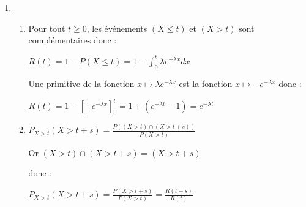 \begin{corrige}
     \par
     \begin{enumerate}
          \par
          \item
          \par
          \begin{enumerate}[label=\alph*.]
               \par
               \item  Pour tout $t\geqslant 0$, les événements $\left(X\leqslant t\right)$ et $\left(X > t\right)$ sont complémentaires donc :
               \par
               \par
               \par
               $R\left(t\right)=1-P\left(X\leqslant t\right)=1-\int_{0}^{t}\lambda  e^{-\lambda  x}dx$
               \par
               \par
               \par
               Une primitive de la fonction $x\mapsto \lambda  e^{-\lambda  x}$ est la fonction  $x\mapsto -e^{-\lambda  x}$ donc :
               \par
               \par
               \par
               $R\left(t\right)=1-\left[- e^{-\lambda  x}\right]_{0}^{t}=1+\left(e^{-\lambda  t}-1\right)=e^{-\lambda  t}$
               \par
               \item  $P_{X > t}\left(X > t+s\right)=\frac{P\left(\left(X > t\right) \cap  \left(X > t+s\right)\right)}{P\left(X > t\right)}$
               \par
               \par
               \par
               Or $\left(X > t\right) \cap  \left(X > t+s\right)=\left(X > t+s\right)$
               \par
               \par
               \par
               donc :
               \par
               \par
               \par
               $P_{X > t}\left(X > t+s\right)=\frac{P\left(X > t+s\right)}{P\left(X > t\right)}=\frac{R\left(t+s\right)}{R\left(t\right)}$
               \par

\end{enumerate}
\end{enumerate}
\end{corrige}
